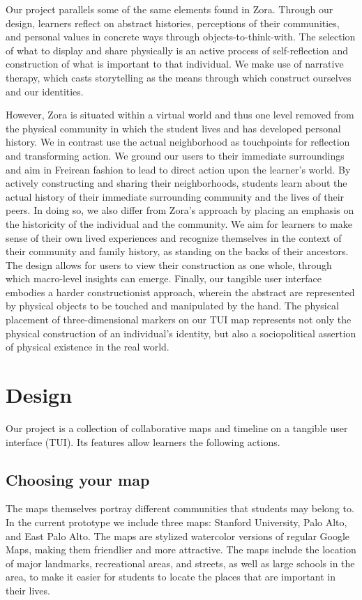 \documentclass{sigchi-ext}
\begin{document}
Our project parallels some of the same elements found in Zora. Through our design, learners reflect on abstract histories, perceptions of their communities, and personal values in concrete ways through objects-to-think-with. The selection of what to display and share physically is an active process of self-reflection and construction of what is important to that individual. We make use of narrative therapy, which casts storytelling as the means through which construct ourselves and our identities.

However, Zora is situated within a virtual world and thus one level removed from the physical community in which the student lives and has developed personal history. We in contrast use the actual neighborhood as touchpoints for reflection and transforming action. We ground our users to their immediate surroundings and aim in Freirean fashion to lead to direct action upon the learner's world. By actively constructing and sharing their neighborhoods, students learn about the actual history of their immediate surrounding community and the lives of their peers. In doing so, we also differ from Zora's approach by placing an emphasis on the historicity of the individual and the community. We aim for learners to make sense of their own lived experiences and recognize themselves in the context of their community and family history, as standing on the backs of their ancestors. The design allows for users to view their construction as one whole, through which macro-level insights can emerge. Finally, our tangible user interface embodies a harder constructionist approach, wherein the abstract are represented by physical objects to be touched and manipulated by the hand. The physical placement of three-dimensional markers on our TUI map represents not only the physical construction of an individual's identity, but also a sociopolitical assertion of physical existence in the real world. 

\section{Design}
Our project is a collection of collaborative maps and timeline on a tangible user interface (TUI). Its features allow learners the following actions.

\subsection{Choosing your map}

The maps themselves portray different communities that students may belong to. In the current prototype we include three maps: Stanford University, Palo Alto, and East Palo Alto. The maps are stylized watercolor versions of regular  Google Maps, making them friendlier and more attractive. The maps include the location of major landmarks, recreational areas, and streets, as well as large schools in the area, to make it easier for students to locate the places that are important in their lives. 
\end{document}
